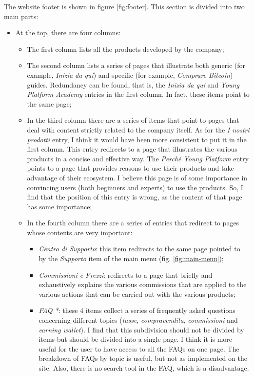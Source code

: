 The website footer is shown in figure \ref{fig:footer}. This section is 
divided into two main parts:
\begin{itemize}
  \item At the top, there are four columns:
  \begin{itemize}
    \item The first column lists all the products developed by the company;

    \item The second column lists a series of pages that illustrate both 
    generic (for example, \textit{Inizia da qui}) and specific (for example, 
    \textit{Comprare Bitcoin}) guides. Redundancy can be found, that is, 
    the \textit{Inizia da qui} and \textit{Young Platform Academy} entries 
    in the first column. In fact, these items point to the same page;

    \item In the third column there are a series of items that point to 
    pages that deal with content strictly related to the company itself. 
    As for the \textit{I nostri prodotti} entry, I think it would have been 
    more consistent to put it in the first column. This entry redirects to 
    a page that illustrates the various products in a concise and effective 
    way. The \textit{Perché Young Platform} entry points to a page that 
    provides reasons to use their products and take advantage of their 
    ecosystem. I believe this page is of some importance in convincing 
    users (both beginners and experts) to use the products. So, I find 
    that the position of this entry is wrong, as the content of that page 
    has some importance;

    \item In the fourth column there are a series of entries that redirect 
    to pages whose contents are very important:
    \begin{itemize}
      \item \textit{Centro di Supporto}: this item redirects to the same 
      page pointed to by the \textit{Supporto} item of the main menu 
      (fig. \ref{fig:main-menu});

      \item \textit{Commissioni e Prezzi}: redirects to a page that briefly 
      and exhaustively explains the various commissions that are applied to 
      the various actions that can be carried out with the various products;

      \item \textit{FAQ *}: these 4 items collect a series of frequently 
      asked questions concerning different topics (\textit{tasse}, 
      \textit{compravendita}, \textit{commissioni} and 
      \textit{earning wallet}). I find that this subdivision should not 
      be divided by items but should be divided into a single page. 
      I think it is more useful for the user to have access to all the 
      FAQs on one page. The breakdown of FAQs by topic is useful, but not 
      as implemented on the site. Also, there is no search tool in the 
      FAQ, which is a disadvantage.
    \end{itemize}
  \end{itemize}


\end{itemize}
